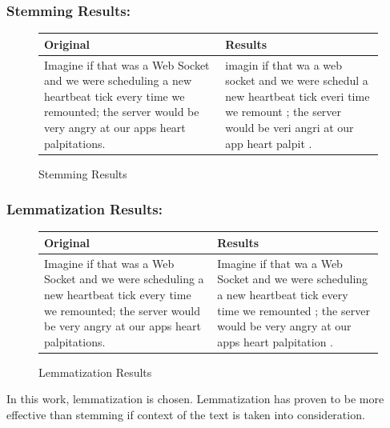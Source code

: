 \subsubsection{Stemming Results:} \label{stemming-vs-lemmatization_results_results_2}
\begin{figure}[H]
  \begin{center}
    \begin{tabular}{|p{9cm}|p{5cm}|}
    \hline\hline
    Original & Results \\ [0.5ex] %
    \hline 
    Imagine if that was a Web Socket and we were scheduling a new heartbeat tick every time we remounted; the server would be very angry at our apps heart palpitations. & imagin if that wa a web socket and we were schedul a new heartbeat tick everi time we remount ; the server would be veri angri at our app heart palpit .  \\ 
    \hline 
    \end{tabular}
  \end{center}
  \caption{Stemming Results}
  \label{fig:stemming-vs-lemmatization_results_results_2}
\end{figure}

\subsubsection{Lemmatization Results:} \label{stemming-vs-lemmatization_results_results_1}
\begin{figure}[H]
  \begin{center}
    \begin{tabular}{|p{9cm}|p{5cm}|}
    \hline\hline
    Original & Results \\ [0.5ex] %
    \hline 
    Imagine if that was a Web Socket and we were scheduling a new heartbeat tick every time we remounted; the server would be very angry at our apps heart palpitations. & Imagine if that wa a Web Socket and we were scheduling a new heartbeat tick every time we remounted ; the server would be very angry at our apps heart palpitation .  \\ 
    \hline 
    \end{tabular}
  \end{center}
  \caption{Lemmatization Results}
  \label{fig:stemming-vs-lemmatization_results_results_1}
\end{figure}

\noindent In this work, lemmatization is chosen. Lemmatization has proven to be more effective than stemming if context of the text is taken into consideration. 

